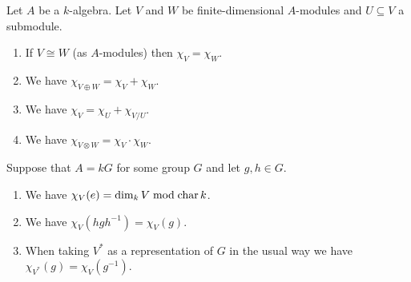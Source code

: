 \begin{prop}
 Let $A$ be a $k$-algebra. Let $V$ and $W$ be finite-dimensional $A$-modules and $U \subseteq V$ a submodule.
 \begin{enumerate}[label=\emph{\alph*)},leftmargin=*]
  \item
   If $V \cong W$ (as $A$-modules) then $\chi_V = \chi_W$.
  \item
   We have $\chi_{V \oplus W} = \chi_V + \chi_W$.
  \item
   We have $\chi_V = \chi_U + \chi_{V/U}$.
  \item
   We have $\chi_{V \otimes W} = \chi_V \cdot \chi_W$.
 \end{enumerate}
 Suppose that $A = kG$ for some group $G$ and let $g,h \in G$.
 \begin{enumerate}[label=\emph{\alph*)},leftmargin=*,resume]
  \item
   We have $\chi_V(e) = \dim_k V \bmod \operatorname{char} k$.
  \item
   We have $\chi_V(hgh^{-1}) = \chi_V(g)$.
  \item
   When taking $V^*$ as a representation of $G$ in the usual way we have $\chi_{V^*}(g) = \chi_V(g^{-1})$.
 \end{enumerate}
\end{prop}
